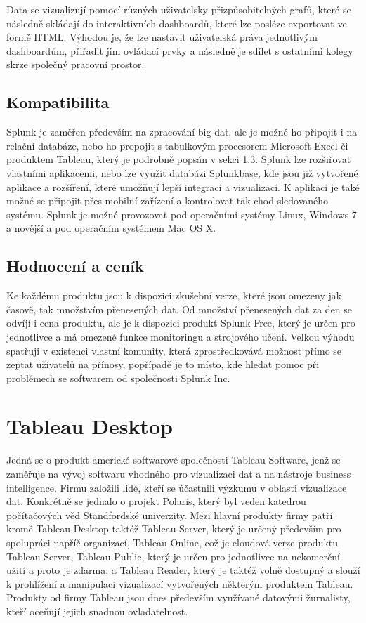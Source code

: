 \documentclass[czech,BP]{thesiskiv}
\begin{document}
Data se vizualizují pomocí různých uživatelsky přizpůsobitelných grafů, které se následně skládají do interaktivních dashboardů, které lze posléze exportovat ve formě HTML. Výhodou je, že lze nastavit uživatelská práva jednotlivým dashboardům, přiřadit jim ovládací prvky a následně je sdílet s ostatními kolegy skrze společný pracovní prostor.


\subsection{Kompatibilita}
Splunk je zaměřen především na zpracování big dat, ale je možné ho připojit i na relační databáze, nebo ho propojit s tabulkovým procesorem Microsoft Excel či produktem Tableau, který je podrobně popsán v sekci 1.3. Splunk lze rozšiřovat vlastními aplikacemi, nebo lze využít databázi Splunkbase, kde jsou již vytvořené aplikace a rozšíření, které umožňují lepší integraci a vizualizaci. K aplikaci je také možné se připojit přes mobilní zařízení a kontrolovat tak chod sledovaného systému. Splunk je možné provozovat pod operačními systémy Linux, Windows 7 a novější a pod operačním systémem Mac OS X. \cite{Splunk_a_kompatibilita}

\subsection{Hodnocení a ceník}
 Ke každému produktu jsou k dispozici zkušební verze, které jsou omezeny jak časově, tak množstvím přenesených dat. Od množství přenesených dat za den se odvíjí i cena produktu, ale je k dispozici produkt Splunk Free, který je určen pro jednotlivce a má omezené funkce monitoringu a strojového učení. Velkou výhodu spatřuji v existenci vlastní komunity, která zprostředkovává možnost přímo se zeptat uživatelů na přínosy, popřípadě je to místo, kde hledat pomoc při problémech se softwarem od společnosti Splunk Inc.
 
 
 \section{Tableau Desktop}
 Jedná se o produkt americké softwarové společnosti Tableau Software, jenž se zaměřuje na vývoj softwaru vhodného pro vizualizaci dat a na nástroje business intelligence. Firmu založili lidé, kteří se účastnili výzkumu v oblasti vizualizace dat. Konkrétně se jednalo o projekt Polaris, který byl veden katedrou počítačových věd Standfordské univerzity.\cite{TableauHistory} Mezi hlavní produkty firmy patří kromě Tableau Desktop taktéž Tableau Server, který je určený především pro spolupráci napříč organizací, Tableau Online, což je cloudová verze produktu Tableau Server, Tableau Public, který je určen pro jednotlivce na nekomerční užití a proto je zdarma, a Tableau Reader, který je taktéž volně dostupný a slouží k prohlížení a manipulaci vizualizací vytvořených některým produktem Tableau. Produkty od firmy Tableau jsou dnes především využívané datovými žurnalisty, kteří oceňují jejich snadnou ovladatelnost.
 
\end{document}
